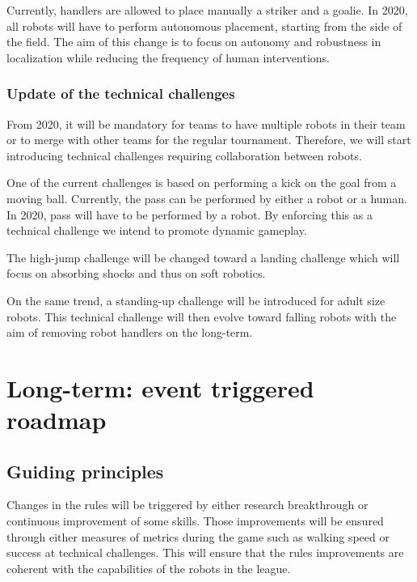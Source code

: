 \documentclass{article}
\begin{document}
Currently, handlers are allowed to place manually a striker and a goalie.
In 2020, all robots will have to perform autonomous placement,
starting from the side of the field.
The aim of this change is to focus on autonomy and robustness in localization
while reducing the frequency of human interventions.

\subsubsection{Update of the technical challenges}

From 2020, it will be mandatory for teams to have multiple robots in their team
or to merge with other teams for the regular tournament.
Therefore, we will start introducing technical challenges requiring collaboration between robots.

One of the current challenges is based on performing a kick on the goal from a moving ball.
Currently, the pass can be performed by either a robot or a human.
In 2020, pass will have to be performed by a robot.
By enforcing this as a technical challenge we intend to promote dynamic gameplay.

The high-jump challenge will be changed toward a landing challenge which will
focus on absorbing shocks and thus on soft robotics.

On the same trend, a standing-up challenge will be introduced for adult size robots.
This technical challenge will then evolve toward falling robots with the aim of removing
robot handlers on the long-term.


\section{\label{sec:LongTerm}Long-term: event triggered roadmap}



\subsection{Guiding principles}

Changes in the rules will be triggered by either research breakthrough or
continuous improvement of some skills. Those improvements will be ensured
through either measures of metrics during the game such as walking speed or
success at technical challenges. This will ensure that the rules improvements
are coherent with the capabilities of the robots in the league.
\end{document}
